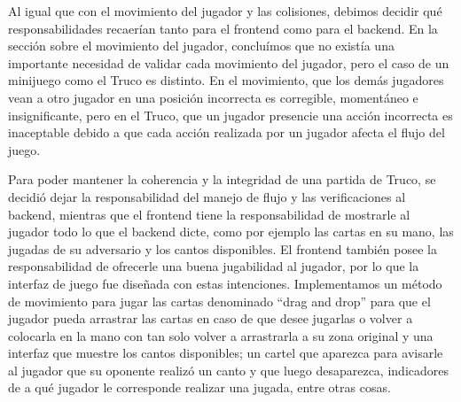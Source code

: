 Al igual que con el movimiento del jugador y las colisiones, debimos decidir qué 
responsabilidades recaerían tanto para el frontend como para el backend. En la sección 
sobre el movimiento del jugador, concluímos que no existía una importante necesidad de 
validar cada movimiento del jugador, pero el caso de un minijuego como el Truco es distinto. 
En el movimiento, que los demás jugadores vean a otro jugador en una posición incorrecta es 
corregible, momentáneo e insignificante, pero en el Truco, que un jugador presencie una acción 
incorrecta es inaceptable debido a que cada acción realizada por un jugador afecta el flujo del juego.

Para poder mantener la coherencia y la integridad de una partida de Truco, se decidió dejar 
la responsabilidad del manejo de flujo y las verificaciones al backend, mientras que el 
frontend tiene la responsabilidad de mostrarle al jugador todo lo que el backend dicte, 
como por ejemplo las cartas en su mano, las jugadas de su adversario y los cantos disponibles. 
El frontend también posee la responsabilidad de ofrecerle una buena jugabilidad al jugador, 
por lo que la interfaz de juego fue diseñada con estas intenciones. Implementamos un método 
de movimiento para jugar las cartas denominado “drag and drop” para que el jugador pueda 
arrastrar las cartas en caso de que desee jugarlas o volver a colocarla en la mano con tan 
solo volver a arrastrarla a su zona original y una interfaz que muestre los cantos disponibles; 
un cartel que aparezca para avisarle al jugador que su oponente realizó un canto y que luego 
desaparezca, indicadores de a qué jugador le corresponde realizar una jugada, entre otras cosas.
